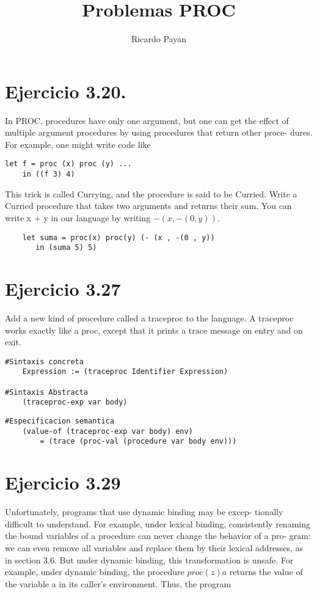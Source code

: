 \documentclass{article}
\title{ Problemas PROC }
\author{Ricardo Payan}
\begin{document}
\maketitle

\section*{Ejercicio 3.20.}


In PROC, procedures have only one argument, but one can get the
effect of multiple argument procedures by using procedures that return other proce-
dures. For example, one might write code like


\begin{lstlisting}
let f = proc (x) proc (y) ...
    in ((f 3) 4)
\end{lstlisting}

This trick is called Currying, and the procedure is said to be Curried. Write a Curried
procedure that takes two arguments and returns their sum. You can write x + y in
our language by writing $−(x, −(0, y))$.

\begin{lstlisting}
    let suma = proc(x) proc(y) (- (x , -(0 , y))
	   in (suma 5) 5)
\end{lstlisting}

\section*{Ejercicio 3.27}
Add a new kind of procedure called a traceproc to the language.
A traceproc works exactly like a proc, except that it prints a trace message on
entry and on exit.

\begin{lstlisting}
#Sintaxis concreta
    Expression := (traceproc Identifier Expression)

#Sintaxis Abstracta
    (traceproc-exp var body)
\end{lstlisting}

\begin{lstlisting}
#Especificacion semantica
    (value-of (traceproc-exp var body) env)
        = (trace (proc-val (procedure var body env)))
\end{lstlisting}

\section*{Ejercicio 3.29}
Unfortunately, programs that use dynamic binding may be excep-
tionally difficult to understand. For example, under lexical binding, consistently
renaming the bound variables of a procedure can never change the behavior of a pro-
gram: we can even remove all variables and replace them by their lexical addresses,
as in section 3.6. But under dynamic binding, this transformation is unsafe.
For example, under dynamic binding, the procedure $proc (z) a$ returns the value
of the variable a in its caller’s environment. Thus, the program
\end{document}

